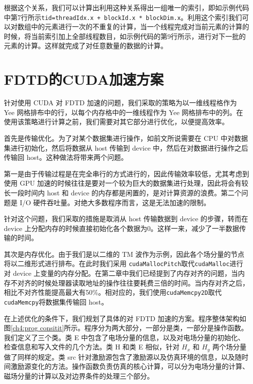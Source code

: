根据这个关系，我们可以计算出利用这种关系得出一组唯一的索引，即如示例代码中第7行所示\lstinline|tid=threadIdx.x + blockId.x * blockDim.x|。利用这个索引我们可以对数组中的元素进行一次的不重复的计算，当一个线程完成对当前元素的计算的时候，将当前索引加上全部线程数目，如示例代码的第9行所示，进行对下一批的元素的计算。这样就完成了对任意数量的数据的计算。

\section{FDTD的CUDA加速方案}

针对使用 CUDA 对 FDTD 加速的问题，我们采取的策略为以一维线程格作为 Yee 网格排布中的行，以每个内存格中的一维线程作为 Yee 网格排布中的列。在使用该策略进行计算之前，我们需要对其它部分进行优化，以便提高效率。

首先是传输优化。为了对某个数据集进行操作，如前文所说需要在 CPU 中对数据集进行初始化，然后将数据从 host 传输到 device 中，然后在对数据进行操作之后传输回 host。这种做法将带来两个问题。

第一是由于传输过程是在完全串行的方式进行的，因此传输效率较低，尤其考虑到使用 GPU 加速的时候往往是要对一个较为巨大的数据集进行处理，因此将会有较长一段时间内 host 和 device 的内存都是闲置的，是对计算资源的浪费。第二个问题是 I/O 硬件吞吐量。对绝大多数程序而言，这是无法加速的限制。

针对这个问题，我们采取的措施是取消从 host 传输数据到 device 的步骤，转而在 device 上分配内存的时候直接初始化各个数据为0。这样一来，减少了一半数据传输的时间。

其次是内存优化。由于我们是以二维的 TM 波作为示例，因此各个场分量的节点将以二维形式进行排布。在此时我们采用 \lstinline|cudaMallocPitch|取代\lstinline|cudaMalloc|进行对 device 上变量的内存分配。在第二章中我们已经提到了内存对齐的问题，当内存不对齐的时候处理器读取地址的操作往往要耗费三倍的时间。当内存对齐之后，相比不对齐性能提高最大有50\%。相对应的，我们使用\lstinline|cudaMemcpy2D|取代\lstinline|cudaMemcpy|将数据集传输回 host。

在上述优化的条件下，我们规划了具体的对 FDTD 加速的方案。程序整体架构如图\ref{ch4:prog consitit}所示。程序分为两大部分，一部分是类，一部分是操作函数。我们定义了三个类。类 E 中包含了电场分量的信息，以及对电场分量的初始化、检查信息和写入文件的几个方法。类 H 和类 E 相似，针对 $H_x$ 和 $H_y$ 两个场分量做了同样的规定。类 src 针对激励源包含了激励源以及仿真环境的信息，以及随时间激励源变化的方法。操作函数负责仿真的核心计算，可以分为电场分量的计算、磁场分量的计算以及对边界条件的处理三个部分。

